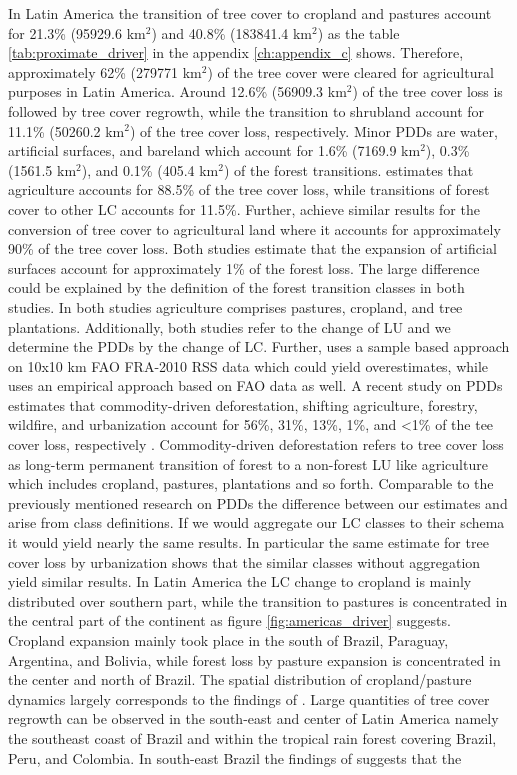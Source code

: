 			In Latin America the transition of tree cover to cropland and pastures account for 21.3\% (95929.6 km$^2$) and 40.8\% (183841.4 km$^2$) as the table \ref{tab:proximate_driver} in the appendix \ref{ch:appendix_c} shows. Therefore, approximately 62\% (279771 km$^2$) of the tree cover were cleared for agricultural purposes in Latin America. Around 12.6\% (56909.3 km$^2$) of the tree cover loss is followed by tree cover regrowth, while the transition to shrubland account for 11.1\% (50260.2 km$^2$) of the tree cover loss, respectively. Minor \acp{PDD} are water, artificial surfaces, and bareland which account for 1.6\% (7169.9 km$^2$), 0.3\% (1561.5 km$^2$), and 0.1\% (405.4 km$^2$) of the forest transitions. \citet{Sy2015} estimates that agriculture accounts for 88.5\% of the tree cover loss, while transitions of forest cover to other \ac{LC} accounts for 11.5\%. Further, \citet{Hosonuma2012} achieve similar results for the conversion of tree cover to agricultural land where it accounts for approximately 90\% of the tree cover loss. Both studies estimate that the expansion of artificial surfaces account for approximately 1\% of the forest loss. The large difference could be explained by the definition of the forest transition classes in both studies. In both studies agriculture comprises pastures, cropland, and tree plantations. Additionally, both studies refer to the change of \ac{LU} and we determine the \acp{PDD} by the change of \ac{LC}. Further, \citeauthor{Sy2015} uses a sample based approach on 10x10 km \ac{FAO} FRA-2010 RSS data which could yield overestimates, while \citeauthor{Hosonuma2012} uses an empirical approach based on \ac{FAO} data as well. A recent study on \acp{PDD} estimates that commodity-driven deforestation, shifting agriculture, forestry, wildfire, and urbanization account for 56\%, 31\%, 13\%, 1\%, and <1\% of the tee cover loss, respectively \citep{Curtis2018}. Commodity-driven deforestation refers to tree cover loss as long-term permanent transition of forest to a non-forest \ac{LU} like agriculture which includes cropland, pastures, plantations and so forth. Comparable to the previously mentioned research on \acp{PDD} the difference between our estimates and \citeauthor{Curtis2018} arise from class definitions. If we would aggregate our \ac{LC} classes to their schema it would yield nearly the same results. In particular the same estimate for tree cover loss by urbanization shows that the similar classes without aggregation yield similar results. In Latin America the \ac{LC} change to cropland is mainly distributed over southern part, while the transition to pastures is concentrated in the central part of the continent as figure \ref{fig:americas_driver} suggests. Cropland expansion mainly took place in the south of Brazil, Paraguay, Argentina, and Bolivia, while forest loss by pasture expansion is concentrated in the center and north of Brazil. The spatial distribution of cropland/pasture dynamics largely corresponds to the findings of \citet{Graesser2015}. Large quantities of tree cover regrowth can be observed in the south-east and center of Latin America namely the southeast coast of Brazil and within the tropical rain forest covering Brazil, Peru, and Colombia. In south-east Brazil the findings of \citeauthor{Curtis2018} suggests that the 